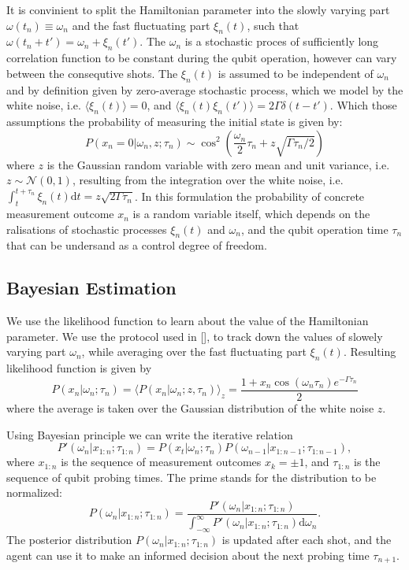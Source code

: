 \documentclass[aps,twocolumn,pra,notitlepage,]{revtex4-2}
\begin{document}
It is convinient to split the Hamiltonian parameter into the slowly varying part $\omega(t_n) \equiv \omega_n$ and the fast fluctuating part $\xi_n(t)$, such that $\omega(t_n+t') = \omega_n + \xi_n(t')$. The $\omega_n$ is a stochastic proces of sufficiently long correlation function to be constant during the qubit operation, however can vary between the consequtive shots. The $\xi_n(t)$ is assumed to be independent of $\omega_n$ and by definition given by zero-average stochastic process, which we model by the white noise, i.e. $\langle \xi_n(t) \rangle = 0$, and $\langle \xi_n(t) \xi_n(t') \rangle = 2\Gamma \delta(t-t')$. Which those assumptions the probability of measuring the initial state is given by:
\begin{equation}
    P(x_n = 0|\omega_n, z;\tau_n) \sim \cos^2\left(\frac{\omega_n}{2}\tau_n + z \sqrt{\Gamma \tau_n/2} \right)
\end{equation}
where $z$ is the Gaussian random variable with zero mean and unit variance, i.e. $z \sim \mathcal N(0,1)$, resulting from the integration over the white noise, i.e. $\int_t^{t+\tau_n} \xi_n(t) \text{d}t = z \sqrt{2\Gamma \tau_n}$. In this formulation the probability of concrete measurement outcome $x_n$ is a random variable itself, which depends on the ralisations of stochastic processes $\xi_n(t)$ and $\omega_n$, and the qubit operation time $\tau_n$ that can be undersand as a control degree of freedom.

\subsection{Bayesian Estimation}
We use the likelihood function to learn about the value of the Hamiltonian parameter. We use the protocol used in [], to track down the values of slowely varying part $\omega_n$, while averaging over the fast fluctuating part $\xi_n(t)$. Resulting likelihood function is given by
\begin{equation}
    P(x_n|\omega_n;\tau_n) = \big\langle P(x_n|\omega_n;z,\tau_n) \big\rangle_z = \frac{1 + x_n\cos(\omega_n \tau_n)e^{-\Gamma\tau_n}}{2}
\end{equation}
where the average is taken over the Gaussian distribution of the white noise $z$.

Using Bayesian principle we can write the iterative relation
\begin{equation}
    P'(\omega_n|x_{1:n};\tau_{1:n}) = P(x_t|\omega_n;\tau_n) P(\omega_{n-1}|x_{1:n-1};\tau_{1:n-1}),
\end{equation}
where $x_{1:n}$ is the sequence of measurement outcomes $x_k = \pm 1$, and $\tau_{1:n}$ is the sequence of qubit probing times. The prime stands for the distribution to be normalized:
\begin{equation}
    P(\omega_n|x_{1:n};\tau_{1:n}) = \frac{P'(\omega_n|x_{1:n};\tau_{1:n})}{\int_{-\infty}^{\infty} P'(\omega_n|x_{1:n};\tau_{1:n}) \text{d}\omega_n}.
\end{equation}
The posterior distribution $P(\omega_n|x_{1:n};\tau_{1:n})$ is updated after each shot, and the agent can use it to make an informed decision about the next probing time $\tau_{n+1}$. 
\end{document}
